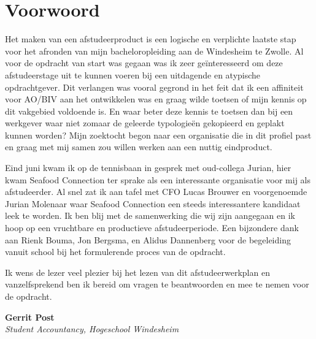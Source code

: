 \documentclass[10pt,a4paper,oneside]{report}
\title{\titel}
\author{\auteur}
\date{\datum}
\newcommand\blankpage{
    \null
    \thispagestyle{empty}
    \newpage}
\begin{document}


\afterpage{\blankpage}
\BgThispage

\chapter*{Voorwoord}
\thispagestyle{empty}
\BgThispage
Het maken van een afstudeerproduct is een logische en verplichte laatste stap voor het afronden van mijn bacheloropleiding aan de Windesheim te Zwolle. Al voor de opdracht van start was gegaan was ik zeer geïnteresseerd om deze afstudeerstage uit te kunnen voeren bij een uitdagende en atypische opdrachtgever. Dit verlangen was vooral gegrond in het feit dat ik een affiniteit voor AO/BIV aan het ontwikkelen was en graag wilde toetsen of mijn kennis op dit vakgebied voldoende is. En waar beter deze kennis te toetsen dan bij een werkgever waar niet zomaar de geleerde typologieën gekopieerd en geplakt kunnen worden?
Mijn zoektocht begon naar een organisatie die in dit profiel past en graag met mij samen zou willen werken aan een nuttig eindproduct.

Eind juni kwam ik op de tennisbaan in gesprek met oud-collega Jurian, hier kwam Seafood Connection ter sprake als een interessante organisatie voor mij als afstudeerder. Al snel zat ik aan tafel met CFO Lucas Brouwer en voorgenoemde Jurian Molenaar waar Seafood Connection een steeds interessantere kandidaat leek te worden. Ik ben blij met de samenwerking die wij zijn aangegaan en ik hoop op een vruchtbare en productieve afstudeerperiode. Een bijzondere dank aan Rienk Bouma, Jon Bergsma, en Alidus Dannenberg voor de begeleiding vanuit school bij het formulerende proces van de opdracht. 

Ik wens de lezer veel plezier bij het lezen van dit afstudeerwerkplan en vanzelfsprekend ben ik bereid om vragen te beantwoorden en mee te nemen voor de opdracht.

\bigskip
\noindent
\textbf{Gerrit Post} \\
\textit{Student Accountancy, Hogeschool Windesheim}
\end{document}
